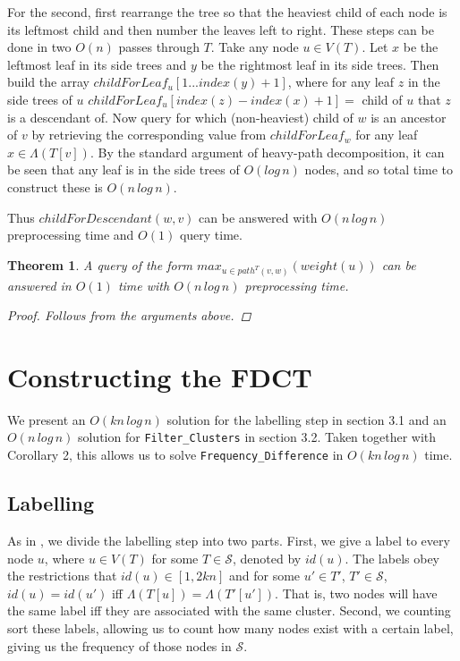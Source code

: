 \documentclass{article}
\newcommand{\leafset}{\Lambda}
\newtheorem{rmqstructure}[incompatibility]{Theorem}
\begin{document}
    For the second, first rearrange the tree so that the heaviest child of each node is its leftmost child and then number the leaves left to right. These steps can be done in two $O(n)$ passes through $T$. Take any node $u \in V(T)$. Let $x$ be the leftmost leaf in its side trees and $y$ be the rightmost leaf in its side trees. Then build the array $childForLeaf_u[1 ... index(y) + 1]$, where for any leaf $z$ in the side trees of $u$ $childForLeaf_u[index(z) - index(x) + 1] = $ child of $u$ that $z$ is a descendant of. Now query for which (non-heaviest) child of $w$ is an ancestor of $v$ by retrieving the corresponding value from $childForLeaf_w$ for any leaf $x \in \leafset(T[v])$. By the standard argument of heavy-path decomposition, it can be seen that any leaf is in the side trees of $O(log\,n)$ nodes, and so total time to construct these is $O(n\,log\,n)$.

    Thus $childForDescendant(w, v)$ can be answered with $O(n\,log\,n)$ preprocessing time and $O(1)$ query time.
    \newline

    \begin{rmqstructure}
        \label{theorem:rmqstructure}
        A query of the form $max_{u \in path^{T}(v, w)}(weight(u))$ can be answered in $O(1)$ time with $O(n\,log\,n)$ preprocessing time.

        \begin{proof}
            Follows from the arguments above.
        \end{proof}
    \end{rmqstructure}

    \section{Constructing the FDCT}
    \label{sec:freqdiffconstruction}

    We present an $O(kn\,log\,n)$ solution for the labelling step in section 3.1 and an $O(n\,log\,n)$ solution for \texttt{Filter\_Clusters} in section 3.2. Taken together with Corollary 2, this allows us to solve \texttt{Frequency\_Difference} in $O(kn\,log\,n)$ time.

    \subsection{Labelling}
    As in \cite{gawrychowski2017faster}, we divide the labelling step into two parts. First, we give a label to every node $u$, where $u \in V(T)$ for some $T \in \mathcal{S}$, denoted by $id(u)$. The labels obey the restrictions that $id(u) \in [1, 2kn]$ and for some $u' \in T'$, $T' \in \mathcal{S}$, $id(u) = id(u')$ iff $\leafset(T[u]) = \leafset(T'[u'])$. That is, two nodes will have the same label iff they are associated with the same cluster. Second, we counting sort these labels, allowing us to count how many nodes exist with a certain label, giving us the frequency of those nodes in $\mathcal{S}$.
\end{document}
